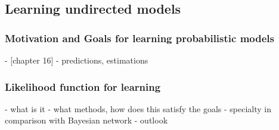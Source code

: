 




\subsection{Learning undirected models}

\subsubsection{Motivation and Goals for learning probabilistic models}
- [chapter 16]
- predictions, estimations

\subsubsection{Likelihood function for learning}

- what is it
- what methods, how does this satisfy the goals
- specialty in comparison with Bayesian network
- outlook
